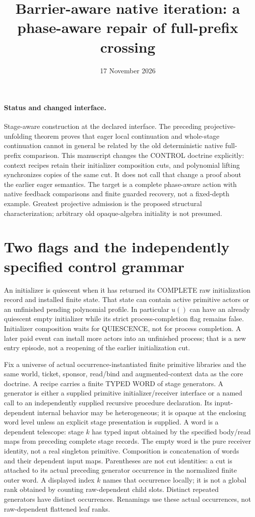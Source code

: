 \documentclass[11pt]{article}
\title{Barrier-aware native iteration: a phase-aware repair of full-prefix crossing}
\date{17 November 2026}
\begin{document}
\maketitle
\paragraph{Status and changed interface.} Stage-aware construction at the declared interface. The preceding projective-unfolding theorem proves that eager local continuation and whole-stage continuation cannot in general be related by the old deterministic native full-prefix comparison. This manuscript changes the CONTROL doctrine explicitly: context recipes retain their initializer composition cuts, and polynomial lifting synchronizes copies of the same cut. It does not call that change a proof about the earlier eager semantics. The target is a complete phase-aware action with native feedback comparisons and finite guarded recovery, not a fixed-depth example. Greatest projective admission is the proposed structural characterization; arbitrary old opaque-algebra initiality is not presumed.

\section{Two flags and the independently specified control grammar}
An initializer is quiescent when it has returned its COMPLETE raw initialization record and installed finite state. That state can contain active primitive actors or an unfinished pending polynomial profile. In particular $u()$ can have an already quiescent empty initializer while its strict process-completion flag remains false. Initializer composition waits for QUIESCENCE, not for process completion. A later paid event can install more actors into an unfinished process; that is a new entry episode, not a reopening of the earlier initialization cut.

Fix a universe of actual occurrence-instantiated finite primitive libraries and the same world, ticket, sponsor, read/bind and augmented-context data as the core doctrine. A recipe carries a finite TYPED WORD of stage generators. A generator is either a supplied primitive initializer/receiver interface or a named call to an independently supplied recursive procedure declaration. Its input-dependent internal behavior may be heterogeneous; it is opaque at the enclosing word level unless an explicit stage presentation is supplied. A word is a dependent telescope: stage $k$ has typed input obtained by the specified body/read maps from preceding complete stage records. The empty word is the pure receiver identity, not a real singleton primitive. Composition is concatenation of words and their dependent input maps. Parentheses are not cut identities: a cut is attached to its actual preceding generator occurrence in the normalized finite outer word. A displayed index $k$ names that occurrence locally; it is not a global rank obtained by counting raw-dependent child slots. Distinct repeated generators have distinct occurrences. Renamings use these actual occurrences, not raw-dependent flattened leaf ranks.
\end{document}

